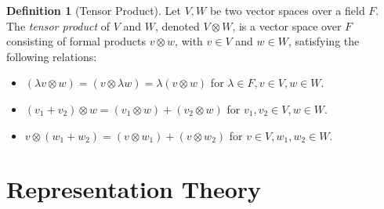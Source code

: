 \documentclass{article}
\theoremstyle{definition}
\newtheorem{definition}{Definition}[subsection]
\begin{document}
\begin{definition}[Tensor Product]
    Let $V,W$ be two vector spaces over a field $F$. The \textit{tensor product} of $V$ and $W$, denoted $V\otimes W$, is a vector space over $F$ consisting of formal products $v\otimes w$, with $v\in V$ and $w\in W$, satisfying the following relations:
    \begin{itemize}
        \item $(\lambda v\otimes w)=(v\otimes \lambda w)=\lambda(v\otimes w)$ for $\lambda\in F, v\in V, w\in W$.
        \item $(v_1+v_2)\otimes w = (v_1\otimes w) + (v_2\otimes w)$ for $v_1,v_2\in V, w\in W$.
        \item $v\otimes (w_1+w_2) = (v\otimes w_1) + (v\otimes w_2)$ for $v\in V, w_1, w_2\in W$.
    \end{itemize}
\end{definition}

\section{Representation Theory}
\setcounter{subsection}{-1}
\end{document}
